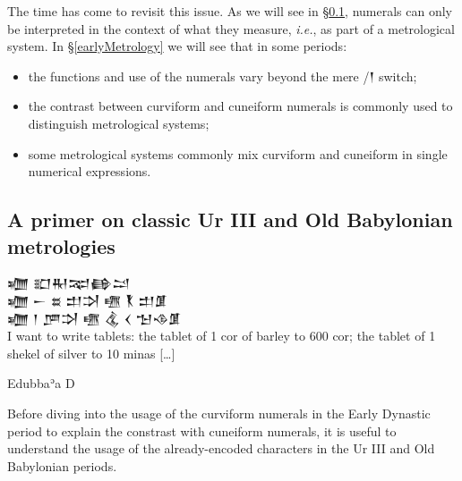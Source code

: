 \documentclass[10pt, a4paper, twoside]{article}
\newcommand\oneAšC{{\proposalfont\symbol{"12550}}} %
\newcommand{\idest}{\emph{i.e.}}
\renewcommand{\epigraphsize}{\footnotesize}
\begin{document}
The time has come to revisit this issue.
As we will see in §\ref{metrology},
numerals can only be interpreted in the context of what they measure, \idest,
as part of a metrological system.
In §\ref{earlyMetrology} we will see that in some periods:
\begin{itemize}[nosep]
  \item the functions and use of the numerals vary beyond the mere \oneAšC/{\xsuxfont 𒁹} switch;
  \item the contrast between curviform and cuneiform numerals is commonly used to distinguish metrological systems;
  \item some metrological systems commonly mix curviform and cuneiform in single numerical expressions.
\end{itemize}

\subsection{A primer on classic Ur III and Old Babylonian metrologies}
\label{metrology}
{\settowidth{\epigraphwidth}{\epigraphsize\obfont 𒁾 𒁹 𒂆𒋫 𒍠 𒆬 𒌋 𒈠𒈾𒂠 \hspace{1.5em}}
\epigraph{
{\obfont 𒁾 𒊬𒊑𒉈\hfill 𒂵𒁺} \\
{\obfont 𒁾 𒀸 𒊺 𒄥𒋫 𒍠 \hfill {\nafont 𒐞} 𒄥𒂠} \\
{\obfont 𒁾 𒁹 𒂆𒋫 𒍠 \hfill 𒆬 \hfill 𒌋 𒈠𒈾𒂠} \\
I want to write tablets: the tablet of 1 cor of barley to
600 cor; the tablet of 1 shekel of silver to 10 minas […]}{Edubbaʾa D}}

Before diving into the usage of the curviform numerals
in the Early Dynastic period to explain the constrast
with cuneiform numerals, it is useful to understand
the usage of the already-encoded characters in the
Ur III and Old Babylonian periods.
\end{document}
